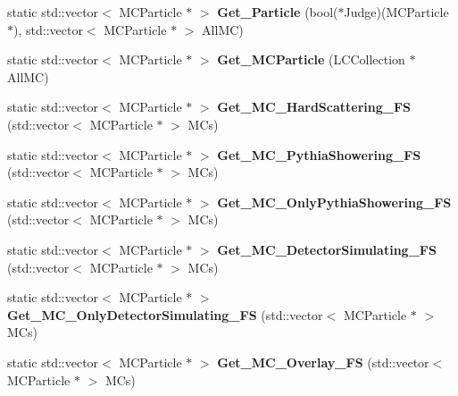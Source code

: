 \begin{DoxyCompactItemize}
\item 
\hypertarget{classToolSet_1_1CMC_ae5e3cc992d63d6efb8030bdb170b87d1}{
static std::vector$<$ MCParticle $\ast$ $>$ {\bfseries Get\_\-Particle} (bool($\ast$Judge)(MCParticle $\ast$), std::vector$<$ MCParticle $\ast$ $>$ AllMC)}
\label{classToolSet_1_1CMC_ae5e3cc992d63d6efb8030bdb170b87d1}

\item 
\hypertarget{classToolSet_1_1CMC_aec3000cf58c5ef65b62938decced8303}{
static std::vector$<$ MCParticle $\ast$ $>$ {\bfseries Get\_\-MCParticle} (LCCollection $\ast$AllMC)}
\label{classToolSet_1_1CMC_aec3000cf58c5ef65b62938decced8303}

\item 
\hypertarget{classToolSet_1_1CMC_a899d324f086d12abb75db9d87798ed91}{
static std::vector$<$ MCParticle $\ast$ $>$ {\bfseries Get\_\-MC\_\-HardScattering\_\-FS} (std::vector$<$ MCParticle $\ast$ $>$ MCs)}
\label{classToolSet_1_1CMC_a899d324f086d12abb75db9d87798ed91}

\item 
\hypertarget{classToolSet_1_1CMC_a321f55fa02ad6ed18931bc906b2e19ee}{
static std::vector$<$ MCParticle $\ast$ $>$ {\bfseries Get\_\-MC\_\-PythiaShowering\_\-FS} (std::vector$<$ MCParticle $\ast$ $>$ MCs)}
\label{classToolSet_1_1CMC_a321f55fa02ad6ed18931bc906b2e19ee}

\item 
\hypertarget{classToolSet_1_1CMC_aea4e69e23c45ca6ac4674ee90d56fc1c}{
static std::vector$<$ MCParticle $\ast$ $>$ {\bfseries Get\_\-MC\_\-OnlyPythiaShowering\_\-FS} (std::vector$<$ MCParticle $\ast$ $>$ MCs)}
\label{classToolSet_1_1CMC_aea4e69e23c45ca6ac4674ee90d56fc1c}

\item 
\hypertarget{classToolSet_1_1CMC_af0a81c6e40cc44cecfe9947be99783d4}{
static std::vector$<$ MCParticle $\ast$ $>$ {\bfseries Get\_\-MC\_\-DetectorSimulating\_\-FS} (std::vector$<$ MCParticle $\ast$ $>$ MCs)}
\label{classToolSet_1_1CMC_af0a81c6e40cc44cecfe9947be99783d4}

\item 
\hypertarget{classToolSet_1_1CMC_a766e7761a6db662243c7490a615c380e}{
static std::vector$<$ MCParticle $\ast$ $>$ {\bfseries Get\_\-MC\_\-OnlyDetectorSimulating\_\-FS} (std::vector$<$ MCParticle $\ast$ $>$ MCs)}
\label{classToolSet_1_1CMC_a766e7761a6db662243c7490a615c380e}

\item 
\hypertarget{classToolSet_1_1CMC_a0174dfbf7511f9fa827d9fff33aabc8b}{
static std::vector$<$ MCParticle $\ast$ $>$ {\bfseries Get\_\-MC\_\-Overlay\_\-FS} (std::vector$<$ MCParticle $\ast$ $>$ MCs)}
\label{classToolSet_1_1CMC_a0174dfbf7511f9fa827d9fff33aabc8b}


\end{DoxyCompactItemize}
